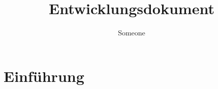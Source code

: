 \documentclass[11pt, a4paper]{article}
\title{Entwicklungsdokument}
\author{Someone}
\begin{document}
%   
\maketitle
%
\clearpage
%
\tableofcontents
%
\clearpage
%
\section{Einführung}
%
\end{document}
